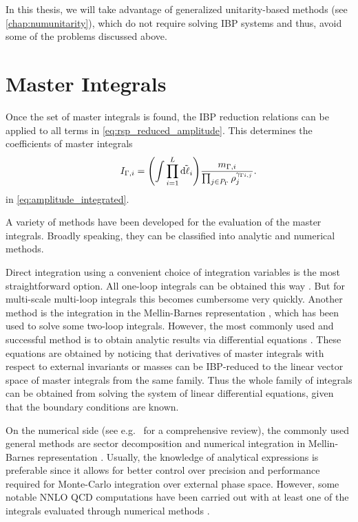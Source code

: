 In this thesis, we will take advantage of generalized unitarity-based methods (see \cref{chap:numunitarity}),
which do not require solving IBP systems and thus,
avoid some of the problems discussed above.

\section{Master Integrals}

Once the set of master integrals is found, the IBP reduction relations can be applied 
to all terms in \cref{eq:rsp_reduced_amplitude}.
This determines the coefficients of master integrals
\begin{equation} \label{eq:master_integrals}
    \qquad I_{\Gamma,i} = 
    \qty(\int \prod_{i=1}^{L} \tilde{\dd{\ell_i}}) \frac{m_{\Gamma,i}}{\prod_{j\in P_\Gamma} \rho_j^{\gamma_{\Gamma i,j}}}.
\end{equation}
in \cref{eq:amplitude_integrated}.

A variety of methods have been developed for the evaluation of the master integrals.
Broadly speaking, they can be classified into analytic and numerical methods.

Direct integration using a convenient choice of integration variables is the most straightforward option.
All one-loop integrals can be obtained this way \cite{vanHameren:2010cp,Ellis:2007qk,tHooft:1978jhc,Denner:2010tr}.
But for multi-scale multi-loop integrals this becomes  cumbersome   very quickly.
Another method is the integration in the Mellin-Barnes  representation  \cite{Smirnov:1999gc,Tausk:1999vh,Dubovyk:2017cqw}, which
has been used to solve some two-loop integrals.
However, the most commonly used and successful method is to obtain analytic results via
differential equations \cite{Kotikov:1990kg,Remiddi:1997ny,Gehrmann:1999as,Henn:2013pwa,Argeri:2007up,Henn:2014qga}. 
These equations are obtained by noticing that
derivatives of master integrals with respect to
external invariants or masses can be IBP-reduced to the linear vector space of master integrals from the same family.
Thus the whole family of integrals can be obtained from solving the system of linear differential equations,
given that the boundary conditions are known.

On the numerical side (see e.g.\ \cite{Freitas:2016sty} for a comprehensive review),
the commonly used general methods are sector decomposition \cite{Binoth:2000ps,Binoth:2003ak}
and numerical integration in Mellin-Barnes representation \cite{Czakon:2005rk,Anastasiou:2005cb}.
Usually, the knowledge of analytical expressions is preferable since it allows for better control over
precision and performance required for Monte-Carlo integration over external phase space. However,
some notable NNLO QCD computations have been carried out with at least one of the integrals evaluated through numerical
methods \cite{Jones:2018hbb,Grazzini:2018bsd,Baglio:2018lrj}.

